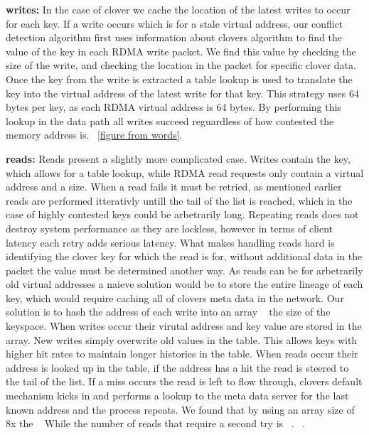 \textbf{writes:} In the case of clover we cache the location of the latest writes to occur for
each key. If a write occurs which is for a stale virtual address, our conflict
detection algorithm first uses information about clovers algorithm to find the
value of the key in each RDMA write packet. We find this value by checking the
size of the write, and checking the location in the packet for specific clover
data. Once the key from the write is extracted a table lookup is used to
translate the key into the virtual address of the latest write for that key.
This strategy uses 64 bytes per key, as each RDMA virtual address is 64 bytes.
By performing this lookup in the data path all writes succeed reguardless of how
contested the memory address is. ~\ref{figure from words}.

\textbf{reads:} Reads present a slightly more complicated case. Writes contain
the key, which allows for a table lookup, while RDMA read requests only contain
a virtual address and a size. When a read fails it must be retried, as mentioned
earlier reads are performed itterativly untill the tail of the list is reached,
which in the case of highly contested keys could be arbetrarily long. Repeating
reads does not destroy system performance as they are lockless, however in terms
of client latency each retry adds serious latency. What makes handling reads
hard is identifying the clover key for which the read is for, without additional
data in the packet the value must be determined another way. As reads can be for
arbetrarily old virtual addresses a naieve solution would be to store the entire
lineage of each key, which would require caching all of clovers meta data in the
network. Our solution is to hash the address of each write into an array
~ the size of the keyspace. When writes occur their virutal address and
key value are stored in the array. New writes simply overwrite old values in the
table. This allows keys with higher hit rates to maintain longer histories in
the table. When reads occur their address is looked up in the table, if the
address has a hit the read is steered to the tail of the list. If a miss occurs
the read is left to flow through, clovers default mechanism kicks in and
performs a lookup to the meta data server for the last known address and the
process repeats. We found that by using an array size of 8x the ~ While the number of reads that require a
second try is ~. ~.

